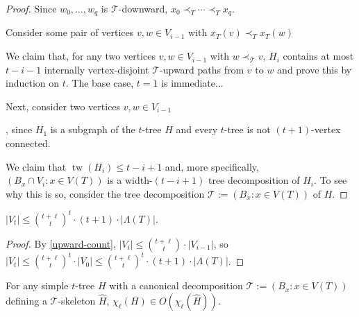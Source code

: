 \documentclass[kpfonts]{patmorin}
\DeclareMathOperator{\tw}{tw}
\newcommand{\lrn}{\chi_{\ell}}
\theoremstyle{named}
\begin{document}
\begin{proof}
    Since $w_0,\ldots,w_q$ is $\mathcal{T}$-downward, $x_0\prec_T\cdots\prec_T x_q$.


    Consider some pair of vertices $v,w\in V_{i-1}$ with $x_T(v)\prec_T x_T(w)$


    We claim that, for any two vertices $v,w\in V_{i-1}$ with $w\prec_\mathcal{T} v$, $H_i$ contains at most $t-i-1$ internally vertex-disjoint $\mathcal{T}$-upward paths from $v$ to $w$ and prove this by induction on $t$.  The base case, $t=1$ is immediate...

    Next, consider two vertices $v,w\in V_{i-1}$


    , since $H_1$ is a subgraph of the $t$-tree $H$ and every $t$-tree is not $(t+1)$-vertex connected.

    We claim that $\tw(H_i)\le t-i+1$ and, more specifically, $(B_x\cap V_i:x\in V(T))$ is a width-$(t-i+1)$ tree decomposition of $H_i$.  To see why this is so, consider the tree decomposition $\mathcal{T}:=(B_x:x\in V(T))$ of $H$.

\end{proof}


\begin{lem}\label{skeleton-size}
    $|V_t|\le \binom{t+\ell}{t}^t\cdot (t+1)\cdot|\Lambda(T)|$.
\end{lem}

\begin{proof}
    By \cref{upward-count}, $|V_i|\le \binom{t+\ell}{t}\cdot |V_{i-1}|$, so $|V_t|\le \binom{t+\ell}{t}^t\cdot|V_0| \le \binom{t+\ell}{t}^t\cdot (t+1)\cdot|\Lambda(T)|$.
\end{proof}


\begin{lem}\label{skeleton-colour}
     For any simple $t$-tree $H$ with a canonical decomposition $\mathcal{T}:=(B_x:x\in V(T))$ defining a $\mathcal{T}$-skeleton $\hat{H}$,  $\lrn(H)\in O(\lrn(\hat{H}))$.
\end{lem}
\end{document}
